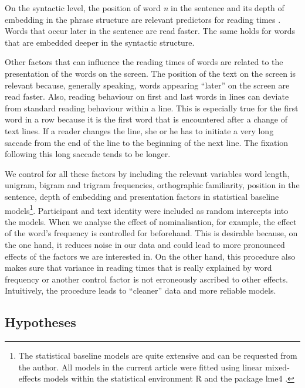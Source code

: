 \documentclass[output=paper]{langsci/langscibook}
\begin{document}
On the syntactic level, the position of word \textit{n} in the sentence and its depth of embedding in the phrase structure are relevant predictors for reading times \citep[cf. ][]{Pynte2008}. Words that occur later in the sentence are read faster. The same holds for words that are embedded deeper in the syntactic structure.

Other factors that can influence the reading times of words are related to the presentation of the words on the screen. The position of the text on the screen is relevant because, generally speaking, words appearing “later” on the screen are read faster. Also, reading behaviour on first and last words in lines can deviate from standard reading behaviour within a line. This is especially true for the first word in a row because it is the first word that is encountered after a change of text lines. If a reader changes the line, she or he has to initiate a very long saccade from the end of the line to the beginning of the next line. The fixation following this long saccade tends to be longer.

We control for all these factors by including the relevant variables word length, unigram, bigram and trigram frequencies, orthographic familiarity, position in the sentence, depth of embedding and presentation factors in statistical baseline models\footnote{The statistical baseline models are quite extensive and can be requested from the author. All models in the current article were fitted using linear mixed-effects models within the statistical environment R \citep{R2014} and the package lme4 \citep{Bates2014}.}. Participant and text identity were included as random intercepts into the models. When we analyse the effect of nominalisation, for example, the effect of the word’s frequency is controlled for beforehand. This is desirable because, on the one hand, it reduces noise in our data and could lead to more pronounced effects of the factors we are interested in. On the other hand, this procedure also makes sure that variance in reading times that is really explained by word frequency or another control factor is not erroneously ascribed to other effects. Intuitively, the procedure leads to “cleaner” data and more reliable models. 

\subsection{\label{bkm:Ref283726131}Hypotheses}
\end{document}
